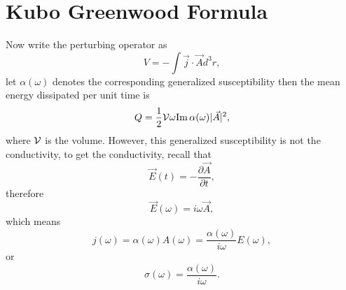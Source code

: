 \documentclass{book}
\renewcommand{\Im}{{\rm Im}}
\numberwithin{equation}{section}
\begin{document}
\section{Kubo Greenwood Formula}
Now write the perturbing operator as
\begin{equation}
  V=-\int\vec{j}\cdot\vec{A}d^3r,
\end{equation}
let $\alpha(\omega)$ denotes the corresponding generalized
susceptibility then the mean energy dissipated per unit time is
\begin{equation}
  Q=\frac{1}{2}{\cal V}\omega\Im\,\alpha(\omega)|\vec{A}|^2,
\end{equation}
where ${\cal V}$ is the volume.  However, this generalized
susceptibility is not the conductivity, to get the conductivity,
recall that
\begin{equation}
  \vec{E}(t)=-\frac{\partial\vec{A}}{\partial t},
\end{equation}
therefore
\begin{equation}
  \vec{E}(\omega)=i\omega\vec{A},
\end{equation}
which means
\begin{equation}
  j(\omega)=\alpha(\omega)A(\omega)=\frac{\alpha(\omega)}{i\omega}E(\omega),
\end{equation}
or
\begin{equation}
  \sigma(\omega)=\frac{\alpha(\omega)}{i\omega}.
\end{equation}
\end{document}
